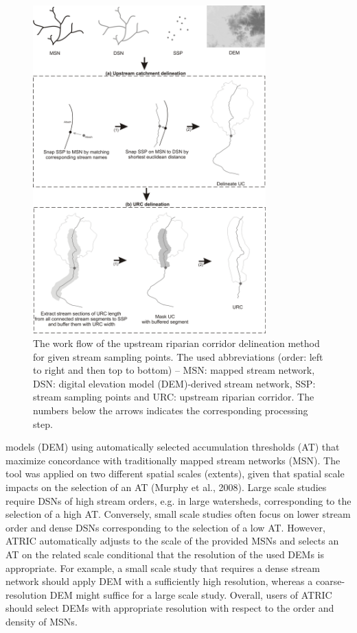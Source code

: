 \noindent\begin{figure}[h!]
  \centering
  \includegraphics[width=0.8\textwidth]{Figures/Fig_2_3.png}
  \caption{The work flow of the upstream riparian corridor delineation method for given stream sampling points. The used abbreviations (order: left to right and then top to bottom) – MSN: mapped stream network, DSN: digital elevation model (DEM)-derived stream network,  SSP: stream sampling points and URC: upstream riparian corridor. The numbers below the arrows indicates the corresponding processing step.}
  \label{Fig_2_3}
\end{figure}

\noindent models (DEM) using automatically selected accumulation thresholds (AT) that maximize concordance with traditionally mapped stream networks (MSN). The tool was applied on two different spatial scales (extents), given that spatial scale impacts on the selection of an AT (Murphy et al., 2008). Large scale studies require DSNs of high stream orders, e.g. in large watersheds, corresponding to the selection of a high AT. Conversely, small scale studies often focus on lower stream order and dense DSNs corresponding to the selection of a low AT. However, ATRIC automatically adjusts to the scale of the provided MSNs and selects an AT on the related scale conditional that the resolution of the used DEMs is appropriate. For example, a small scale study that requires a dense stream network should apply DEM with a sufficiently high resolution, whereas a coarse-resolution DEM might suffice for a large scale study. Overall, users of ATRIC should select DEMs with appropriate resolution with respect to the order and density of MSNs.

